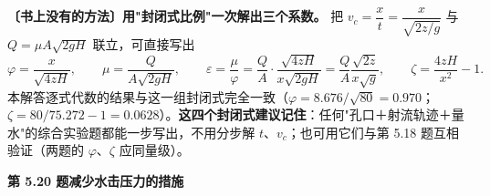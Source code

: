 \begin{banfa}
\textbf{〔书上没有的方法〕用"封闭式比例"一次解出三个系数。} 把 $v_c=\dfrac{x}{t}=\dfrac{x}{\sqrt{2z/g}}$ 与 $Q=\mu A\sqrt{2gH}$ 联立，可直接写出
\[\varphi=\frac{x}{\sqrt{4zH}},\qquad
\mu=\frac{Q}{A\sqrt{2gH}},\qquad
\varepsilon=\frac{\mu}{\varphi}=\frac{Q}{A}\cdot\frac{\sqrt{4zH}}{x\sqrt{2gH}}=\frac{Q}{A}\frac{\sqrt{2z}}{x\sqrt{g}},\qquad
\zeta=\frac{4zH}{x^2}-1.\]
本解答逐式代数的结果与这一组封闭式完全一致（$\varphi=8.676/\sqrt{80}=0.970$；$\zeta=80/75.272-1=0.0628$）。\textbf{这四个封闭式建议记住}：任何"孔口＋射流轨迹＋量水"的综合实验题都能一步写出，不用分步解 $t$、$v_c$；也可用它们与第 5.18 题互相验证（两题的 $\varphi$、$\zeta$ 应同量级）。
\end{banfa}

\noindent\textbf{第 5.20 题\quad 减少水击压力的措施}

